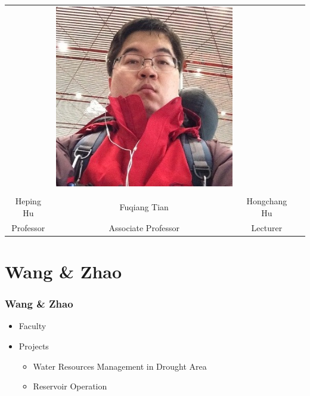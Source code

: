 \documentclass{beamer}
\begin{document}
\begin{CJK}{UTF8}{gkai}
{{\begin{table}
{\begin{tabular}{cccc}
&\begin{minipage}{.3\textwidth}\includegraphics[width=\linewidth]{hongchanghu.jpg}\end{minipage}
\\
\\
\hline
Heping Hu & Fuqiang Tian & Hongchang Hu \\
Professor& Associate Professor & Lecturer\\
\hline
\end{tabular}
}
\end{table}
  }
 
  
  
   
   
  
  
  \section{Wang \& Zhao}
  \frame
  {
  \frametitle{Wang \& Zhao}
  \begin{itemize}
  \item Faculty
  \item Projects
    \begin{itemize}
    \item Water Resources Management in Drought Area
    \item Reservoir Operation
    \end{itemize}
  \end{itemize}
  }
  
}
\end{CJK}
\end{document}
